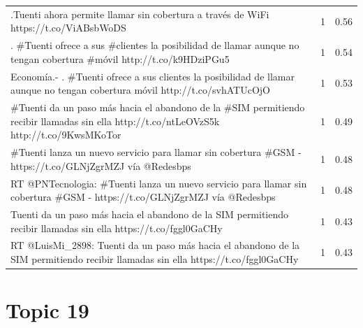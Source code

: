 \begin{longtable}{p{12.5cm}rr}
.Tuenti ahora permite llamar sin cobertura a través de WiFi https://t.co/ViABsbWoDS & 1 & 0.56 \\
. \#Tuenti ofrece a sus  \#clientes la posibilidad de llamar aunque no tengan cobertura  \#móvil http://t.co/k9HDziPGu5 & 1 & 0.54 \\
Economía.- . \#Tuenti ofrece a sus clientes la posibilidad de llamar aunque no tengan cobertura móvil http://t.co/svhATUcOjO & 1 & 0.53 \\
\#Tuenti da un paso más hacia el abandono de la \#SIM permitiendo recibir llamadas sin ella http://t.co/ntLeOVzS5k http://t.co/9KwsMKoTor & 1 & 0.49 \\
\#Tuenti lanza un nuevo servicio para llamar sin cobertura \#GSM - https://t.co/GLNjZgrMZJ vía @Redesbps & 1 & 0.48 \\
RT @PNTecnologia: \#Tuenti lanza un nuevo servicio para llamar sin cobertura \#GSM - https://t.co/GLNjZgrMZJ vía @Redesbps & 1 & 0.48 \\
Tuenti da un paso más hacia el abandono de la SIM permitiendo recibir llamadas sin ella https://t.co/fggl0GaCHy & 1 & 0.43 \\
RT @LuisMi\_2898: Tuenti da un paso más hacia el abandono de la SIM permitiendo recibir llamadas sin ella https://t.co/fggl0GaCHy & 1 & 0.43 \\

\end{longtable}
\clearpage

\section{Topic 19}

